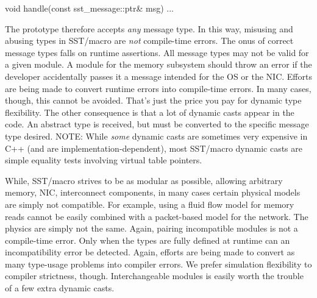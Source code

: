 \begin{CppCode}
void
handle(const sst_message::ptr& msg){
...
}
\end{CppCode}
The prototype therefore accepts \emph{any} message type.
In this way, misusing and abusing types in SST/macro are \emph{not} compile-time errors.
The onus of correct message types falls on runtime assertions.
All message types may not be valid for a given module.
A module for the memory subsystem should throw an error if the developer accidentally passes it a message intended for the OS or the NIC.
Efforts are being made to convert runtime errors into compile-time errors.
In many cases, though, this cannot be avoided.
That's just the price you pay for dynamic type flexibility.
The other consequence is that a lot of dynamic casts appear in the code.
An abstract  type is received, but must be converted to the specific message type desired.
NOTE: While \emph{some} dynamic casts are sometimes very expensive in C++ (and are implementation-dependent),
most SST/macro dynamic casts are simple equality tests involving virtual table pointers.

While, SST/macro strives to be as modular as possible, allowing arbitrary memory, NIC, interconnect components,
in many cases certain physical models are simply not compatible.
For example, using a fluid flow model for memory reads cannot be easily combined with a packet-based model for the network.
The physics are simply not the same.
Again, pairing incompatible modules is not a compile-time error.
Only when the types are fully defined at runtime can an incompatibility error be detected.
Again, efforts are being made to convert as many type-usage problems into compiler errors.
We prefer simulation flexibility to compiler strictness, though. 
Interchangeable modules is easily worth the trouble of a few extra dynamic casts.

